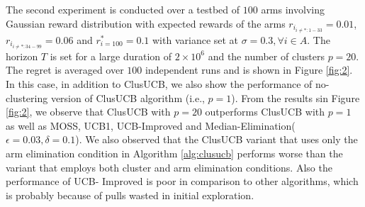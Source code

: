 	The second experiment is conducted over a testbed of $100$ arms involving Gaussian reward distribution with expected rewards of the arms $r_{i_{{i}\neq {*}:1-33}}=0.01$, $r_{i_{{i}\neq {*}:34-99}}=0.06$ and $r^{*}_{i=100}=0.1$ with variance set at $\sigma = 0.3,\forall i\in A$. The horizon $T$ is set for a large duration of $2\times 10^{6}$ and the number of clusters $p=20$. The regret is averaged over $100$ independent runs and is shown in Figure \ref{fig:2}. In this case, in addition to ClusUCB, we also show the performance of no-clustering version of ClusUCB algorithm (i.e., $p=1$).   From the results sin Figure \ref{fig:2}, we observe that ClusUCB with $p=20$ outperforms ClusUCB with $p=1$ as well as MOSS, UCB1, UCB-Improved and Median-Elimination($\epsilon=0.03,\delta=0.1$). We also observed that the ClusUCB variant that uses only  the arm elimination condition in Algorithm \ref{alg:clusucb} performs worse than the variant that employs both cluster and arm elimination conditions. Also the performance of UCB-
Improved is poor in comparison to other algorithms, which is probably because of pulls wasted in initial exploration.

